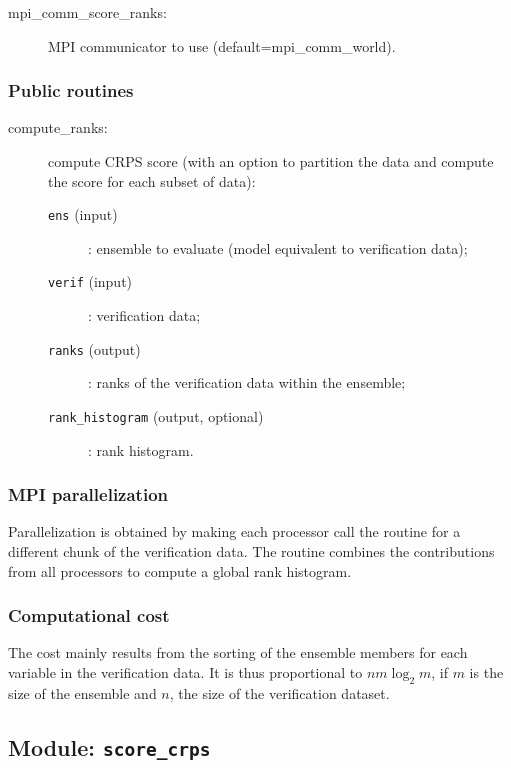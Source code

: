 \documentclass[11pt]{article}
\begin{document}
\begin{description}
\item[mpi\_comm\_score\_ranks:] MPI communicator to use (default=mpi\_comm\_world).
\end{description}

\subsubsection*{Public routines}

\begin{description}
\item[compute\_ranks:] compute CRPS score (with an option to partition the data
                    and compute the score for each subset of data):
  \begin{description}
  \item[{\tt ens} (input)]: ensemble to evaluate (model equivalent to verification data);
  \item[{\tt verif} (input)]: verification data;
  \item[{\tt ranks} (output)]: ranks of the verification data within the ensemble;
  \item[{\tt rank\_histogram} (output, optional)]: rank histogram.
  \end{description}
\end{description}

\subsubsection*{MPI parallelization}

Parallelization is obtained by making each processor call the routine
for a different chunk of the verification data.
The routine combines the contributions from all processors
to compute a global rank histogram.

\subsubsection*{Computational cost}

The cost mainly results from the sorting of the ensemble members
for each variable in the verification data.
It is thus proportional to $n m \log_2 m$,
if $m$ is the size of the ensemble and $n$, the size of the verification dataset.

\subsection{Module: {\tt\bf score\_crps}}
\end{document}
